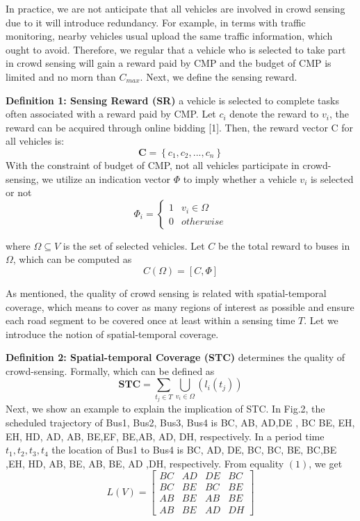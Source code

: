 \documentclass[journal]{IEEEtran}
\begin{document}
  
  In practice, we are not anticipate that all vehicles are involved in crowd sensing due to it will introduce redundancy. For example, in terms with traffic monitoring, nearby vehicles usual upload the same traffic information, which ought to avoid. Therefore, we regular that a vehicle who is selected to take part in crowd sensing will gain a reward paid by CMP and the budget of CMP is limited and no morn than $C_{max}$. Next, we define the sensing reward.
  
  \noindent
  \textbf{Definition 1: Sensing Reward (SR)} a vehicle is selected to complete tasks often associated with a reward paid by CMP. Let $c_{i}$ denote the reward to $v_{i}$, the reward can be acquired through online bidding [1]. Then, the reward vector C for all vehicles is:
 \begin{equation}
 \textbf{C}=\left \{c_{1},c_{2},...,c_{n} \right \}
 \end{equation}
 With the constraint of budget of CMP, not all vehicles participate in crowd-sensing, we utilize an indication vector $\Phi $ to imply whether a vehicle $v_{i}$ is selected or not
 \begin{equation}
    \Phi_{i}= \left\{\begin{matrix}
	1&v_{i}\in \Omega \\ 
	0&otherwise\end{matrix}\right.
 \end{equation}

 where $\Omega \subseteq V$ is the set of selected vehicles. Let $C$ be the total reward to buses in $\Omega$, which can be computed as
 \begin{equation}
  C(\Omega )=\left [ C,\Phi  \right ]
 \end{equation}

As mentioned, the quality of crowd sensing is related with spatial-temporal coverage, which means to cover as many regions of interest as possible and ensure each road segment to be covered once at least within a sensing time $T$. Let we introduce the notion of spatial-temporal coverage.

\noindent
\textbf{Definition 2: Spatial-temporal Coverage (STC)} determines the quality of crowd-sensing. Formally, which can be defined as
\begin{equation}
\textbf{STC}=\sum_{t_{j}\in T}\bigcup_{v_{i}\in \Omega}\left (l_{i}(t_{j}) \right)
\end{equation}
Next, we show an example to explain the implication of STC. In Fig.2, the scheduled trajectory of Bus1, Bus2, Bus3, Bus4 is {BC, AB, AD,DE }, {BC BE, EH}, {EH, HD, AD, AB, BE},{EF, BE,AB, AD, DH}, respectively. In a period time $t_{1},t_{2},t_{3},t_{4}$ the location of  Bus1 to Bus4 is {BC, AD, DE, BC}, {BC, BE, BC,BE },{EH, HD, AB, BE}, {AB, BE, AD ,DH}, respectively. From equality $(1)$, we get
\begin{equation}
L(V)=\begin{bmatrix}
BC &AD &DE &BC \\ 
BC& BE &BC &BE\\ 
AB& BE &AB &BE\\ 
AB& BE &AD &DH
\end{bmatrix}
\end{equation}
\end{document}
